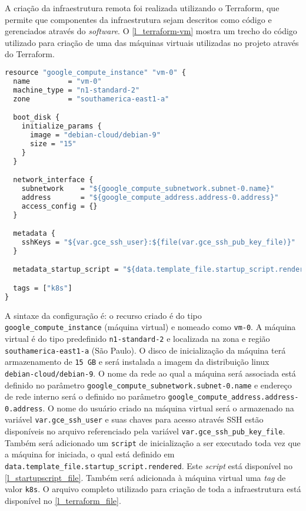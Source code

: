 A criação da infraestrutura remota foi realizada utilizando o Terraform, que permite que componentes da infraestrutura sejam descritos como código e gerenciados através do \textit{software}. O \autoref{l_terraform-vm} mostra um trecho do código utilizado para criação de uma das máquinas virtuais utilizadas no projeto através do Terraform.

\begin{lstlisting}[language=Caml,caption=Configuração de máquina virtual descrita no arquivo de configuração do Terraform,captionpos=t,label=l_terraform-vm, numbers=none]
resource "google_compute_instance" "vm-0" {
  name         = "vm-0"
  machine_type = "n1-standard-2"
  zone         = "southamerica-east1-a"

  boot_disk {
    initialize_params {
      image = "debian-cloud/debian-9"
      size = "15"
    }
  }

  network_interface {
    subnetwork    = "${google_compute_subnetwork.subnet-0.name}"
    address       = "${google_compute_address.address-0.address}"
    access_config = {}
  }

  metadata {
    sshKeys = "${var.gce_ssh_user}:${file(var.gce_ssh_pub_key_file)}"
  }

  metadata_startup_script = "${data.template_file.startup_script.rendered}"

  tags = ["k8s"]
}
\end{lstlisting}

A sintaxe da configuração é: o recurso criado é do tipo \texttt{google\_compute\_instance} (máquina virtual) e nomeado como \texttt{vm-0}. A máquina virtual é do tipo predefinido \texttt{n1-standard-2} e localizada na zona e região \texttt{southamerica-east1-a} (São Paulo). O disco de inicialização da máquina terá armazenamento de \texttt{15 GB} e será instalada a imagem da distribuição linux \texttt{debian-cloud/debian-9}. O nome da rede ao qual a máquina será associada está definido no parâmetro \texttt{google\_compute\_subnetwork.subnet-0.name} e endereço de rede interno será o definido no parâmetro \texttt{google\_compute\_address.address-0.address}. O nome do usuário criado na máquina virtual será o armazenado na variável \texttt{var.gce\_ssh\_user} e suas chaves para acesso através \ac{SSH} estão disponíveis no arquivo referenciado pela variável \texttt{var.gce\_ssh\_pub\_key\_file}. Também será adicionado um \texttt{script} de inicialização a ser executado toda vez que a máquina for iniciada, o qual está definido em \texttt{data.template\_file.startup\_script.rendered}. Este \textit{script} está disponível no \autoref{l_startupscript_file}. Também será adicionada à máquina virtual uma \textit{tag} de valor \texttt{k8s}. O arquivo completo utilizado para criação de toda a infraestrutura está disponível no \autoref{l_terraform_file}.


